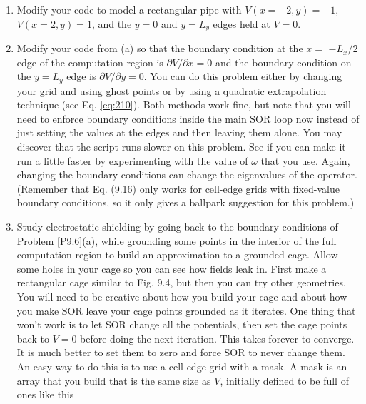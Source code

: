 \begin{problem}\label{P9.6}
\begin{enumerate}[label=(\alph*)]
\item Modify your code to model a rectangular pipe with $V(x=-2, y)=-1$, $V(x=2, y)=1$, and the $y=0$ and $y=L_{y}$ edges held at $V=0$.
\item Modify your code from (a) so that the boundary condition at the $x=$ $-L_{x} / 2$ edge of the computation region is $\partial V / \partial x=0$ and the boundary condition on the $y=L_{y}$ edge is $\partial V / \partial y=0$. You can do this problem either by changing your grid and using ghost points or by using a quadratic extrapolation technique (see Eq. \eqref{eq:210}). Both methods work fine, but note that you will need to enforce boundary conditions inside the main SOR loop now instead of just setting the values at the edges and then leaving them alone.
You may discover that the script runs slower on this problem. See if you can make it run a little faster by experimenting with the value of $\omega$ that you use. Again, changing the boundary conditions can change the eigenvalues of the operator. (Remember that Eq. (9.16) only works for cell-edge grids with fixed-value boundary conditions, so it only gives a ballpark suggestion for this problem.)
\item Study electrostatic shielding by going back to the boundary conditions of Problem \ref{P9.6}(a), while grounding some points in the interior of the full computation region to build an approximation to a grounded cage. Allow some holes in your cage so you can see how fields leak in. First make a rectangular cage similar to Fig. 9.4, but then you can try other geometries.
You will need to be creative about how you build your cage and about how you make SOR leave your cage points grounded as it iterates. One thing that won\rq t work is to let SOR change all the potentials, then set the cage points back to $V=0$ before doing the next iteration. This takes forever to converge. It is much better to set them to zero and force SOR to never change them. An easy way to do this is to use a cell-edge grid with a mask. A mask is an array that you build that is the same size as $V$, initially defined to be full of ones like this

\end{enumerate}
\end{problem}
